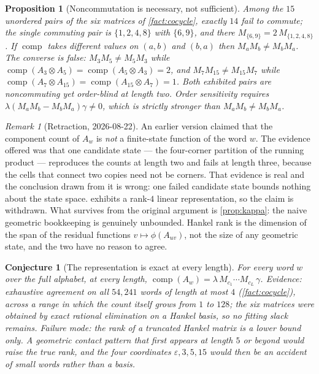 \documentclass[11pt]{amsart}
\newtheorem{proposition}[theorem]{Proposition}
\newtheorem{conjecture}[theorem]{Conjecture}
\theoremstyle{definition}
\theoremstyle{remark}
\newtheorem{remark}[theorem]{Remark}
\begin{document}
\begin{proposition}[Noncommutation is necessary, not sufficient]
\label{prop:noncomm}
Among the $15$ unordered pairs of the six matrices of \cref{fact:cocycle}, exactly $14$ fail to commute; the single commuting pair is $\{1,2,4,8\}$ with $\{6,9\}$, and there $M_{\{6,9\}} = 2\,M_{\{1,2,4,8\}}$. If $\operatorname{comp}$ takes different values on $(a,b)$ and $(b,a)$ then $M_a M_b \neq M_b M_a$. The converse is false: $M_3 M_5 \neq M_5 M_3$ while $\operatorname{comp}(A_3 \otimes A_5) = \operatorname{comp}(A_5 \otimes A_3) = 2$, and $M_7 M_{15} \neq M_{15} M_7$ while $\operatorname{comp}(A_7 \otimes A_{15}) = \operatorname{comp}(A_{15} \otimes A_7) = 1$. Both exhibited pairs are noncommuting yet order-blind at length two. Order sensitivity requires $\lambda(M_a M_b - M_b M_a)\gamma \neq 0$, which is strictly stronger than $M_a M_b \neq M_b M_a$.
\end{proposition}

\begin{remark}[Retraction, 2026-08-22]
\label{rem:retraction}
An earlier version claimed that the component count of $A_w$ is \emph{not} a finite-state function of the word $w$. The evidence offered was that one candidate state --- the four-corner partition of the running product --- reproduces the counts at length two and fails at length three, because the cells that connect two copies need not be corners. That evidence is real and the conclusion drawn from it is wrong: one failed candidate state bounds nothing about the state space.  exhibits a rank-$4$ linear representation, so the claim is withdrawn. What survives from the original argument is \cref{prop:kappa}: the naive geometric bookkeeping is genuinely unbounded. Hankel rank is the dimension of the span of the residual functions $v \mapsto \phi(A_{uv})$, not the size of any geometric state, and the two have no reason to agree.
\end{remark}

\begin{conjecture}[The representation is exact at every length]
\label{con:cocycle}
For every word $w$ over the full alphabet, at every length, $\operatorname{comp}(A_w) = \lambda\,M_{c_1} \cdots M_{c_L}\,\gamma$. \emph{Evidence:} exhaustive agreement on all $54{,}241$ words of length at most $4$ (\cref{fact:cocycle}), across a range in which the count itself grows from $1$ to $128$; the six matrices were obtained by exact rational elimination on a Hankel basis, so no fitting slack remains. \emph{Failure mode:} the rank of a truncated Hankel matrix is a lower bound only. A geometric contact pattern that first appears at length $5$ or beyond would raise the true rank, and the four coordinates $\varepsilon, 3, 5, 15$ would then be an accident of small words rather than a basis.
\end{conjecture}
\end{document}
